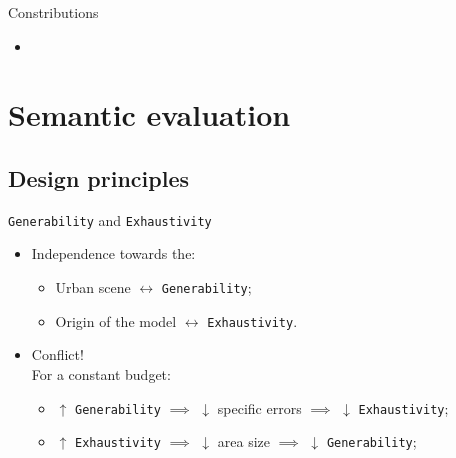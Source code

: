 \documentclass[10pt]{beamer}
\begin{document}
        \begin{frame}{Constributions}
            \begin{itemize}[label=$\blacktriangleright$, font=\color{IGNGreen}, itemsep=2em]
                \item<1-> 
            \end{itemize}
        \end{frame}

    \section{Semantic evaluation}
        \subsection{Design principles}
            \begin{frame}{\texttt{Generability} and \texttt{Exhaustivity}}
                \begin{itemize}[label=$\blacktriangleright$, font=\color{IGNGreen}, itemsep=2em]
                    \item<1-> Independence towards the:
                        \begin{itemize}[label=$\blacktriangleright$, font=\color{IGNGreen}, itemsep=2em]
                            \item<2-> Urban scene \(\leftrightarrow\) \texttt{Generability};
                            \item<3-> Origin of the model \(\leftrightarrow\) \texttt{Exhaustivity}.
                        \end{itemize}
                    \item<4-> Conflict!\\For a constant budget:
                        \begin{itemize}[label=$\blacktriangleright$, font=\color{IGNGreen}, itemsep=2em]
                            \item<5-> \(\uparrow\) \texttt{Generability} \(\implies\) \(\downarrow\) specific errors \(\implies\) \(\downarrow\) \texttt{Exhaustivity};
                            \item<6-> \(\uparrow\) \texttt{Exhaustivity} \(\implies\) \(\downarrow\) area size \(\implies\) \(\downarrow\) \texttt{Generability};
                        \end{itemize}
                \end{itemize}
            \end{frame}
\end{document}
